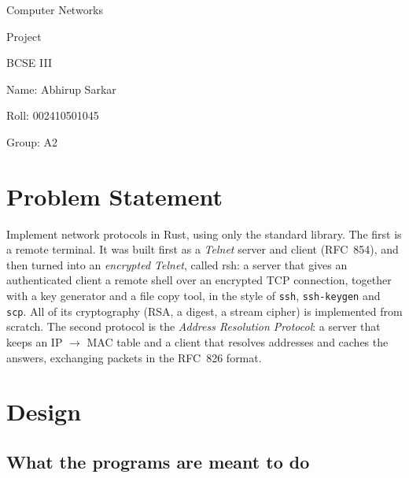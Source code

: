 \documentclass[11pt,a4paper]{article}
\newcommand{\rollno}{002410501045}
\begin{document}
\begin{titlepage}
  \centering
  \vspace*{6cm}
  {\huge Computer Networks\par}
  \vspace{0.8cm}
  {\Large Project\par}
  \vspace{0.5cm}
  {\large BCSE III\par}
  \vspace{4cm}
  {\large Name: Abhirup Sarkar\par}
  \vspace{0.35cm}
  {\large Roll: \rollno\par}
  \vspace{0.35cm}
  {\large Group: A2\par}
  \vfill
\end{titlepage}
\setcounter{page}{1}

\section{Problem Statement}

Implement network protocols in Rust, using only the standard library. The
first is a remote terminal. It was built first as a \emph{Telnet} server and
client (RFC~854), and then turned into an \emph{encrypted Telnet}, called
rsh: a server that gives an authenticated client a remote shell over an
encrypted TCP connection, together with a key generator and a file copy tool,
in the style of \texttt{ssh}, \texttt{ssh-keygen} and \texttt{scp}. All of
its cryptography (RSA, a digest, a stream cipher) is implemented from scratch.
The second protocol is the \emph{Address Resolution Protocol}: a server that
keeps an IP $\rightarrow$ MAC table and a client that resolves addresses and
caches the answers, exchanging packets in the RFC~826 format.



\section{Design}

\subsection{What the programs are meant to do}
\end{document}
